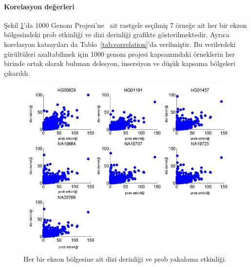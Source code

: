 \documentclass[11pt]{article}
\begin{document}
\paragraph{Korelasyon değerleri} 

Şekil \ref{fig:captureeff}'da 1000 Genom Projesi'ne~\cite{1000GP2012} ait rastgele seçilmiş 7 örneğe ait her bir ekzon bölgesindeki prob etkinliği ve dizi derinliği grafikte gösterilmektedir. Ayrıca korelasyon katsayıları da Tablo~\ref{tab:correlation}'da verilmiştir. Bu verilerdeki gürültüleri azaltabilmek için 1000 genom projesi kapsamındaki örneklerin her birinde ortak olarak bulunan delesyon, insersiyon ve düşük kapsama bölgeleri çıkarıldı. 

\begin{figure}[htb]
\begin{center}
  \includegraphics[scale=0.65]{captureeff.png}
\end{center}
\caption{Her bir ekzon bölgesine ait dizi derinliği ve prob yakalama etkinliği.}
\label{fig:captureeff}
\end{figure}
\end{document}
